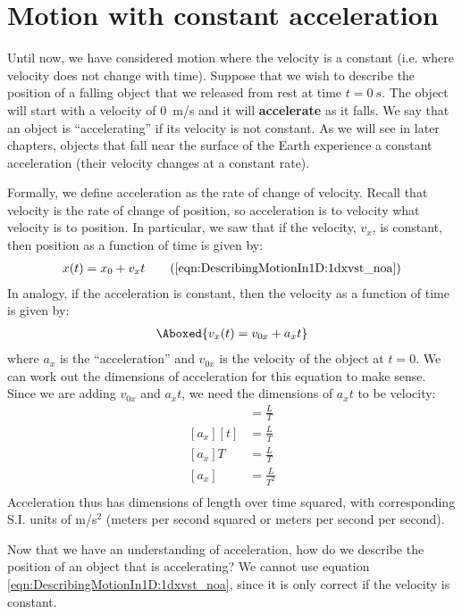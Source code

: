 \section{Motion with constant acceleration}
Until now, we have considered motion where the velocity is a constant (i.e. where velocity does not change with time). Suppose that we wish to describe the position of a falling object that we released from rest at time $t=\SI{0}{s}$. The object will start with a velocity of \SI{0}{m/s} and it will \textbf{accelerate} as it falls. We say that an object is ``accelerating'' if its velocity is not constant. As we will see in later chapters, objects that fall near the surface of the Earth experience a constant acceleration (their velocity changes at a constant rate).

Formally, we define acceleration as the rate of change of velocity. Recall that velocity is the rate of change of position, so acceleration is to velocity what velocity is to position. In particular, we saw that if the velocity, $v_x$, is constant, then position as a function of time is given by:
\begin{align}
x(t) = x_0 + v_xt \tag{\ref{eqn:DescribingMotionIn1D:1dxvst_noa}}
\end{align} 
In analogy, if the acceleration is constant, then the velocity as a function of time is given by:
\begin{align}
\label{eqn:DescribingMotionIn1DL1dvvst}
\Aboxed{v_x(t) = v_{0x} + a_xt }
\end{align}
where $a_x$ is the ``acceleration'' and $v_{0x}$ is the velocity of the object at $t=0$. We can work out the dimensions of acceleration for this equation to make sense. Since we are adding $v_{0x}$ and $a_xt$, we need the dimensions of $a_xt$ to be velocity:
\begin{align*}
[a_xt] &= \frac{L}{T} \\
[a_x][t] &= \frac{L}{T} \\
[a_x]T&= \frac{L}{T} \\
[a_x]&= \frac{L}{T^2} \\
\end{align*}
Acceleration thus has dimensions of length over time squared, with corresponding S.I. units of m/s$^2$ (meters per second squared or meters per second per second). 

Now that we have an understanding of acceleration, how do we describe the position of an object that is accelerating? We cannot use equation \ref{eqn:DescribingMotionIn1D:1dxvst_noa}, since it is only correct if the velocity is constant. 

